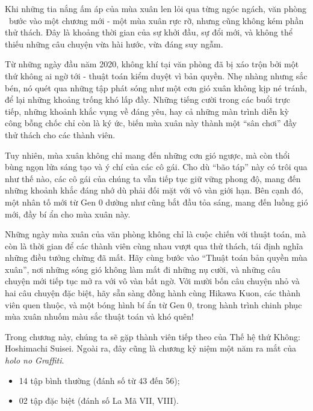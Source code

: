\documentclass[main.tex]{subfiles}
\begin{document}
Khi những tia nắng ấm áp của mùa xuân len lỏi qua từng ngóc ngách, văn phòng \hll\ bước vào một chương mới - một mùa xuân rực rỡ, nhưng cũng không kém phần thử thách. Đây là khoảng thời gian của sự khởi đầu, sự đổi mới, và không thể thiếu những câu chuyện vừa hài hước, vừa đáng suy ngẫm.

Từ những ngày đầu năm 2020, không khí tại văn phòng đã bị xáo trộn bởi một thứ không ai ngờ tới - thuật toán kiểm duyệt vì bản quyền. Nhẹ nhàng nhưng sắc bén, nó quét qua những tập phát sóng như một cơn gió xuân không kịp né tránh, để lại những khoảng trống khó lấp đầy. Những tiếng cười trong các buổi trực tiếp, những khoảnh khắc vụng về đáng yêu, hay cả những màn trình diễn kỳ công bỗng chốc chỉ còn là ký ức, biến mùa xuân này thành một ``sân chơi'' đầy thử thách cho các thành viên.

Tuy nhiên, mùa xuân không chỉ mang đến những cơn gió ngược, mà còn thổi bùng ngọn lửa sáng tạo và ý chí của các cô gái. Cho dù ``bão táp'' này có trôi qua như thế nào, các cô gái của chúng ta vẫn tiếp tục giữ vững phong độ, mang đến những khoảnh khắc đáng nhớ dù phải đối mặt với vô vàn giới hạn. Bên cạnh đó, một nhân tố mới từ Gen 0 dường như cũng bắt đầu tỏa sáng, mang đến luồng gió mới, đầy bí ẩn cho mùa xuân này.

Những ngày mùa xuân của văn phòng không chỉ là cuộc chiến với thuật toán, mà còn là thời gian để các thành viên cùng nhau vượt qua thử thách, tái định nghĩa những điều tưởng chừng đã mất. Hãy cùng bước vào ``Thuật toán bản quyền mùa xuân'', nơi những sóng gió không làm mất đi những nụ cười, và những câu chuyện mới tiếp tục mở ra với vô vàn bất ngờ. Với mười bốn câu chuyện nhỏ và hai câu chuyện đặc biệt, hãy sẵn sàng đồng hành cùng Hikawa Kuon, các thành viên quen thuộc, và một bóng hình bí ẩn từ Gen 0, trong hành trình chinh phục mùa xuân nhuốm màu sắc thuật toán và khó quên!

Trong chương này, chúng ta sẽ gặp thành viên tiếp theo của Thế hệ thứ Không: Hoshimachi Suisei. Ngoài ra, đây cũng là chương kỷ niệm một năm ra mắt của \textit{holo no Graffiti}.

{}
\begin{itemize}
    \item 14 tập bình thường (đánh số từ 43 đến 56);
    \item 02 tập đặc biệt (đánh số La Mã VII, VIII).
\end{itemize}
\end{document}

